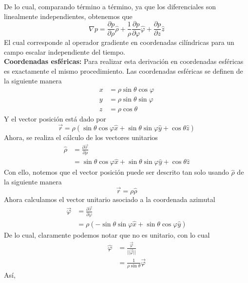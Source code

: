 \documentclass[11pt,letterpaper]{article}
\begin{document}
De lo cual, comparando término a término, ya que los diferenciales son linealmente independientes, obtenemos que
\begin{equation}
    \nabla p=\frac{\partial p }{\partial \rho} \hat{\rho} + \frac{1}{\rho} \frac{\partial p}{\partial \varphi} \hat{\varphi}+\frac{\partial p}{\partial z}\hat{z} 
\end{equation}
El cual corresponde al operador gradiente en coordenadas cilíndricas para un campo escalar independiente del tiempo. \\
\textbf{Coordenadas esféricas:} Para realizar esta derivación en coordenadas esféricas es exactamente el mismo procedimiento. Las coordenadas esféricas se definen de la siguiente manera
\begin{align*}
    x & = \rho\sin{\theta}\cos{\varphi} \\
   y  & = \rho \sin{\theta}\sin{\varphi} \\
    z & = \rho \cos{\theta}
\end{align*}
Y el vector posición está dado por
\begin{equation}
    \vec{r}=\rho(\sin{\theta}\cos{\varphi}\hat{x}+\sin{\theta}\sin{\varphi}\hat{y}+\cos{\theta}\hat{z})
\end{equation}
Ahora, se realiza el cálculo de los vectores unitarios
\begin{align*}
    \hat{\rho} & = \frac{\partial \vec{r}}{\partial \rho} \\
    & = \sin{\theta}\cos{\varphi}\hat{x}+\sin{\theta}\sin{\varphi}\hat{y}+\cos{\theta}\hat{z}
\end{align*}
Con ello, notemos que el vector posición puede ser descrito tan solo usando $\hat{\rho}$ de la siguiente manera
\begin{equation}
    \vec{r}=\rho\hat{\rho}
\end{equation}
Ahora calculamos el vector unitario asociado a la coordenada azimutal
\begin{align*}
    \vec{\varphi} & = \frac{\partial \vec{r}}{\partial \varphi} \\
    & = \rho( -\sin{\theta}\sin{\varphi}\hat{x} + \sin{\theta}\cos{\varphi}\hat{y})
\end{align*}
De lo cual, claramente podemos notar que no es unitario, con lo cual
\begin{align*}
    \hat{\varphi} & =\frac{\vec{\varphi}}{||\vec{\varphi}||} \\
    & = \frac{1}{\rho\sin{\theta}}\vec{\varphi}
\end{align*}
Así,
\end{document}
